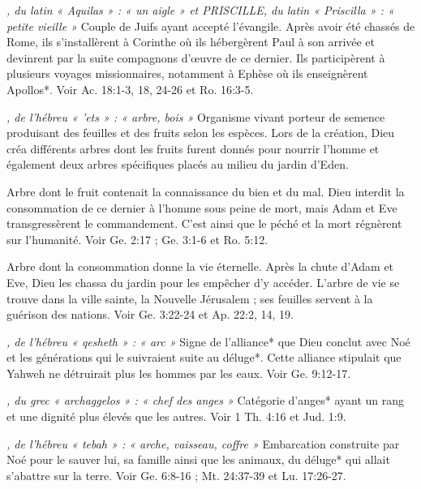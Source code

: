 \begin{multicols}{2}
\textit{, du latin « Aquilas » : « un aigle » et PRISCILLE, du latin « Priscilla » : « petite vieille »}\newline
Couple de Juifs ayant accepté l'évangile. Après avoir été chassés de Rome, ils s'installèrent à Corinthe où ils hébergèrent Paul à son arrivée et devinrent par la suite compagnons d'œuvre de ce dernier. Ils participèrent à plusieurs voyages missionnaires, notamment à Ephèse où ils enseignèrent Apollos*. Voir Ac. 18:1-3, 18, 24-26 et Ro. 16:3-5.

\textit{, de l'hébreu « 'ets » : « arbre, bois »}\newline
Organisme vivant porteur de semence produisant des feuilles et des fruits selon les espèces. Lors de la création, Dieu créa différents arbres dont les fruits furent donnés pour nourrir l'homme et également deux arbres spécifiques placés au milieu du jardin d'Eden.

\textit{}\newline
Arbre dont le fruit contenait la connaissance du bien et du mal. Dieu interdit la consommation de ce dernier à l'homme sous peine de mort, mais Adam et Eve transgressèrent le commandement. C'est ainsi que le péché et la mort régnèrent sur l'humanité. Voir Ge. 2:17 ; Ge. 3:1-6 et Ro. 5:12.

\textit{}\newline
Arbre dont la consommation donne la vie éternelle. Après la chute d'Adam et Eve, Dieu les chassa du jardin pour les empêcher d'y accéder. L'arbre de vie se trouve dans la ville sainte, la Nouvelle Jérusalem ; ses feuilles servent à la guérison des nations. Voir Ge. 3:22-24 et Ap. 22:2, 14, 19.

\textit{, de l'hébreu « qesheth » : « arc »}\newline
Signe de l'alliance* que Dieu conclut avec Noé et les générations qui le suivraient suite au déluge*. Cette alliance stipulait que Yahweh ne détruirait plus les hommes par les eaux. Voir Ge. 9:12-17.

\textit{, du grec « archaggelos » : « chef des anges »}\newline
Catégorie d'anges* ayant un rang et une dignité plus élevés que les autres. Voir 1 Th. 4:16 et Jud. 1:9.

\textit{, de l'hébreu « tebah » : « arche, vaisseau, coffre »}\newline
Embarcation construite par Noé pour le sauver lui, sa famille ainsi que les animaux, du déluge* qui allait s'abattre sur la terre. Voir Ge. 6:8-16 ; Mt. 24:37-39 et Lu. 17:26-27.


\end{multicols}
